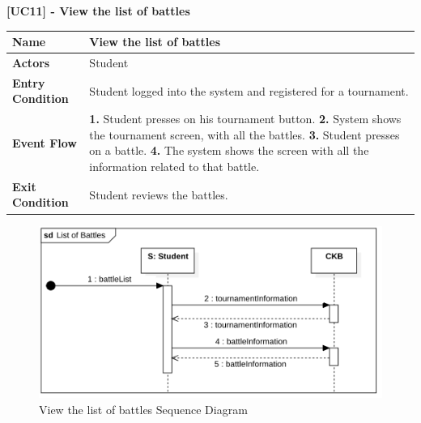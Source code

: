 \clearpage
\raggedright
\textbf{[UC11] - View the list of battles}
\begin{table}[h]
\begin{tabular}{|l|p{12cm}|} \hline 

\rule[-3mm]{0mm}{1cm}
\textbf{Name} & View the list of battles \\ \hline 

\rule[-3mm]{0mm}{1cm}
\textbf{Actors} & Student \\ \hline 

\rule[-3mm]{0mm}{1cm}
\textbf{Entry Condition} & Student logged into the system and registered for a tournament.
\vspace{2pt}
\\ \hline 

\rule[-3mm]{0mm}{1cm}
\textbf{Event Flow} & 
\textbf{1.} Student presses on his tournament button.
\vspace{4pt}
\newline
\textbf{2.} System shows the tournament screen, with all the battles.
\vspace{4pt}
\newline
\textbf{3.} Student presses on a battle.
\vspace{4pt}
\newline
\textbf{4.} The system shows the screen with all the information related to that battle.

\\ \hline 

\rule[-3mm]{0mm}{1cm}
\textbf{Exit Condition} & Student reviews the battles. \\ \hline

\end{tabular}
\end{table}

\begin{figure}[h]
    \centering
    \includegraphics[scale=0.9]{images/SD/ListBattleSD.png} 
    \caption{View the list of battles Sequence Diagram}
    \label{fig_ListBattletSD}
\end{figure}



